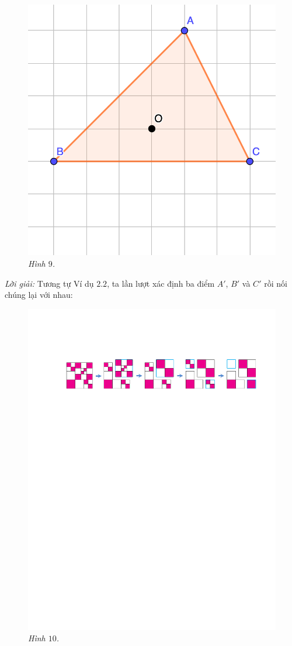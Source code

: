 \begin{multicols}{2}
\begin{figure}[H]
		\includegraphics[width= 0.65\linewidth]{9}
		\caption{\small\textit{\color{toancuabi}Hình $9$.}}
		\vspace*{-5pt}
	\end{figure}
	\textit{Lời giải:} Tương tự Ví dụ $2.2$, ta lần lượt xác định ba điểm $A'$, $B'$ và $C'$ rồi nối chúng lại với nhau:
	\begin{figure}[H]
		\vspace*{-5pt}
		\centering
		\captionsetup{labelformat= empty, justification=centering}
		\includegraphics[width= 0.75\linewidth]{10}
		\caption{\small\textit{\color{toancuabi}Hình $10$.}}

\end{figure}
\end{multicols}
